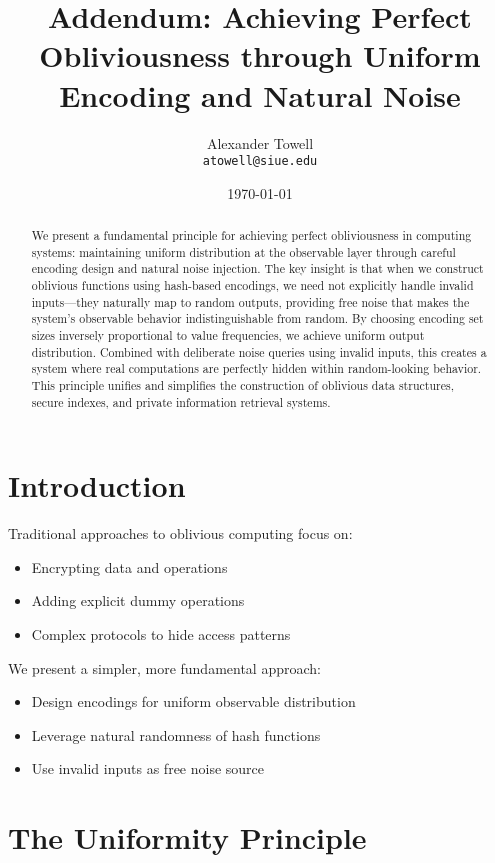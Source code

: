 \documentclass[11pt,final]{article}
\title{Addendum: Achieving Perfect Obliviousness through Uniform Encoding and Natural Noise}
\author{
    Alexander Towell\\
    \texttt{atowell@siue.edu}
}
\date{\today}
\begin{document}
\maketitle

\begin{abstract}
We present a fundamental principle for achieving perfect obliviousness in computing systems: maintaining uniform distribution at the observable layer through careful encoding design and natural noise injection. The key insight is that when we construct oblivious functions using hash-based encodings, we need not explicitly handle invalid inputs—they naturally map to random outputs, providing free noise that makes the system's observable behavior indistinguishable from random. By choosing encoding set sizes inversely proportional to value frequencies, we achieve uniform output distribution. Combined with deliberate noise queries using invalid inputs, this creates a system where real computations are perfectly hidden within random-looking behavior. This principle unifies and simplifies the construction of oblivious data structures, secure indexes, and private information retrieval systems.
\end{abstract}


\section{Introduction}

Traditional approaches to oblivious computing focus on:
\begin{itemize}
    \item Encrypting data and operations
    \item Adding explicit dummy operations
    \item Complex protocols to hide access patterns
\end{itemize}

We present a simpler, more fundamental approach:
\begin{itemize}
    \item Design encodings for uniform observable distribution
    \item Leverage natural randomness of hash functions
    \item Use invalid inputs as free noise source
\end{itemize}

\section{The Uniformity Principle}
\end{document}
